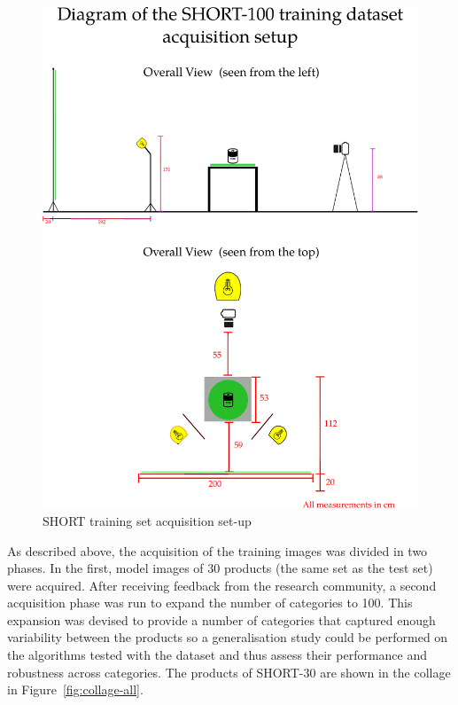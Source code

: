 \begin{figure}
\centering
\includegraphics[width=\linewidth]{gfx/Chapter03/acquisition_diagram.pdf}
\caption{SHORT training set acquisition set-up}
\label{fig:acqsetup}
\end{figure}

As described above, the acquisition of the training images was divided in two phases. In the first, model images of 30 products (the same set as the test set) were acquired. After receiving feedback from the research community, a second acquisition phase was run to expand the number of categories to 100. This expansion was devised to provide a number of categories that captured enough variability between the products so a generalisation study could be performed on the algorithms tested with the dataset and thus assess their performance and robustness across categories. The products of SHORT-30 are shown in the collage in Figure~\ref{fig:collage-all}.

